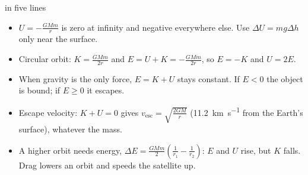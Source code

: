 \begin{summarybox}[unbreakable]{ in five lines}
\begin{itemize}
  \item $U = -\frac{GMm}{r}$ is zero at infinity and negative everywhere else. Use
        $\Delta U = mg\Delta h$ only near the surface.
  \item Circular orbit: $K = \frac{GMm}{2r}$ and $E = U + K = -\frac{GMm}{2r}$, so $E = -K$ and
        $U = 2E$.
  \item When gravity is the only force, $E = K + U$ stays constant. If $E < 0$ the object is
        bound; if $E \ge 0$ it escapes.
  \item Escape velocity: $K + U = 0$ gives $v_\mathrm{esc} = \sqrt{\frac{2GM}{r}}$
        (\qty{11.2}{km.s^{-1}} from the Earth's surface), whatever the mass.
  \item A higher orbit needs energy,
        $\Delta E = \frac{GMm}{2}\left(\frac{1}{r_1} - \frac{1}{r_2}\right)$: $E$ and $U$ rise,
        but $K$ falls. Drag lowers an orbit and speeds the satellite up.
\end{itemize}
\end{summarybox}
